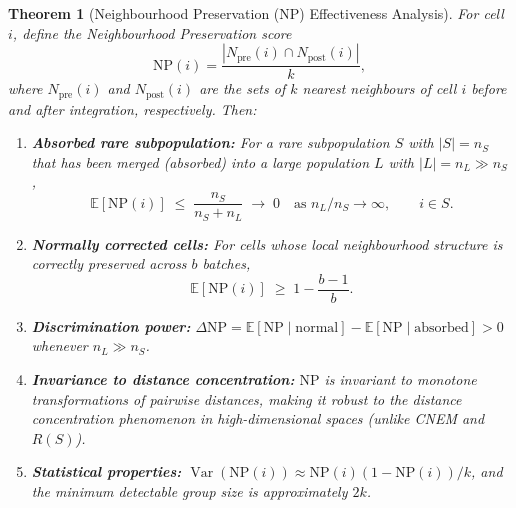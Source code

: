 \documentclass[10pt]{article}
\newtheorem{theorem}{Theorem}
\DeclareMathOperator{\Var}{Var}
\begin{document}
\bigskip


\begin{theorem}[Neighbourhood Preservation (NP) Effectiveness Analysis]
\label{thm:np}
For cell $i$, define the \emph{Neighbourhood Preservation} score
\[
    \mathrm{NP}(i) = \frac{|N_{\mathrm{pre}}(i) \cap N_{\mathrm{post}}(i)|}{k},
\]
where $N_{\mathrm{pre}}(i)$ and $N_{\mathrm{post}}(i)$ are the sets of $k$
nearest neighbours of cell $i$ before and after integration, respectively.
Then:
\begin{enumerate}
\item[\textup{(a)}] \textbf{Absorbed rare subpopulation:}
For a rare subpopulation $S$ with $|S| = n_S$ that has been merged
(absorbed) into a large population $L$ with $|L| = n_L \gg n_S$,
\[
    \mathbb{E}[\mathrm{NP}(i)] \;\le\; \frac{n_S}{n_S + n_L}
    \;\to\; 0 \quad\text{as } n_L/n_S \to \infty,
    \qquad i \in S.
\]

\item[\textup{(b)}] \textbf{Normally corrected cells:}
For cells whose local neighbourhood structure is correctly preserved
across $b$ batches,
\[
    \mathbb{E}[\mathrm{NP}(i)] \;\ge\; 1 - \frac{b-1}{b}.
\]

\item[\textup{(c)}] \textbf{Discrimination power:}
$\Delta\mathrm{NP} = \mathbb{E}[\mathrm{NP}\mid\text{normal}]
- \mathbb{E}[\mathrm{NP}\mid\text{absorbed}] > 0$ whenever
$n_L \gg n_S$.

\item[\textup{(d)}] \textbf{Invariance to distance concentration:}
$\mathrm{NP}$ is invariant to monotone transformations of pairwise
distances, making it robust to the distance concentration phenomenon
in high-dimensional spaces (unlike CNEM and $R(S)$).

\item[\textup{(e)}] \textbf{Statistical properties:}
$\Var(\mathrm{NP}(i)) \approx \mathrm{NP}(i)(1 - \mathrm{NP}(i))/k$,
and the minimum detectable group size is approximately $2k$.
\end{enumerate}
\end{theorem}
\end{document}
